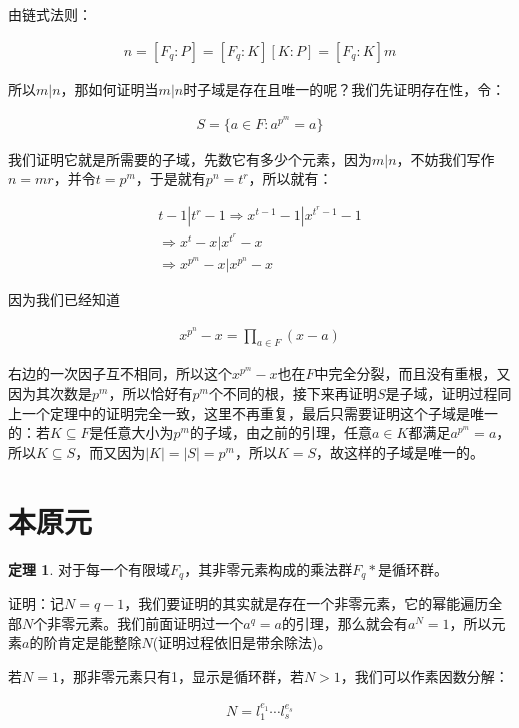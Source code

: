 \documentclass[12pt, a4paper, oneside]{ctexart}
\theoremstyle{definition}
\newtheorem*{theorem}{定理}
\begin{document}
由链式法则：

\begin{align*}
n=[F_q:P]=[F_q:K][K:P]=[F_q:K]m
\end{align*}

所以$m|n$，那如何证明当$m|n$时子域是存在且唯一的呢？我们先证明存在性，令：

\begin{align*}
S=\{a\in F:a^{p^m}=a\}
\end{align*}

我们证明它就是所需要的子域，先数它有多少个元素，因为$m|n$，不妨我们写作$n=mr$，并令$t=p^m$，于是就有$p^n=t^r$，所以就有：

\begin{align*}
t-1|t^r-1\Rightarrow x^{t-1}-1|x^{t^r-1}-1\\
\Rightarrow x^t-x|x^{t^r}-x\\
\Rightarrow x^{p^m}-x|x^{p^n}-x
\end{align*}

因为我们已经知道

\begin{align*}
x^{p^n}-x=\prod_{a\in F}(x-a)
\end{align*}

右边的一次因子互不相同，所以这个$x^{p^m}-x$也在$F$中完全分裂，而且没有重根，又因为其次数是$p^m$，所以恰好有$p^m$个不同的根，接下来再证明$S$是子域，证明过程同上一个定理中的证明完全一致，这里不再重复，最后只需要证明这个子域是唯一的：若$K\subseteq F$是任意大小为$p^m$的子域，由之前的引理，任意$a\in K$都满足$a^{p^m}=a$，所以$K\subseteq S$，而又因为$|K|=|S|=p^m$，所以$K=S$，故这样的子域是唯一的。

\section*{本原元}

\begin{theorem}
对于每一个有限域$F_q$，其非零元素构成的乘法群$F_q*$是循环群。
\end{theorem}

证明：记$N=q-1$，我们要证明的其实就是存在一个非零元素，它的幂能遍历全部$N$个非零元素。我们前面证明过一个$a^q=a$的引理，那么就会有$a^N=1$，所以元素$a$的阶肯定是能整除$N$(证明过程依旧是带余除法)。

若$N=1$，那非零元素只有1，显示是循环群，若$N>1$，我们可以作素因数分解：

\begin{align*}
N=l_1^{e_1}\cdots l_s^{e_s}
\end{align*}
\end{document}
